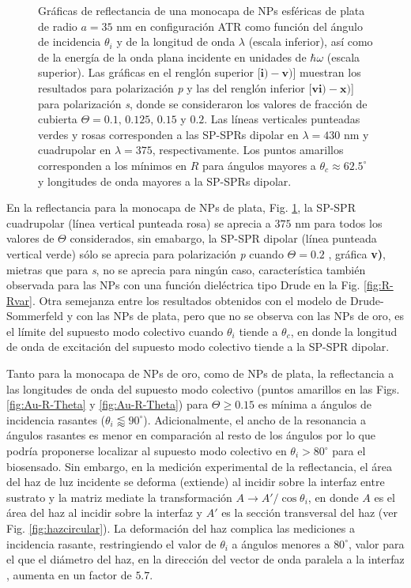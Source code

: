 \begin{figure}[h!]
\vspace*{-.5em}
	\caption{Gráficas de reflectancia de una monocapa de NPs esféricas de plata de radio $a=35$ nm en configuración ATR como función del ángulo de incidencia $\theta_i$ y de la longitud de onda $\lambda$ (escala inferior), así como de la energía de la onda plana incidente en unidades de $\hbar\omega$ (escala superior).  Las gráficas   en el renglón superior [$\mathbf{i)-v)}$] muestran los resultados para  polarización \emph{p} y las del renglón inferior  [$\mathbf{vi)-x)}$]  para polarización  \emph{s}, donde se consideraron los valores de fracción de cubierta $\Theta = 0.1,\,0.125,\,0.15$ y $0.2$.  Las líneas verticales punteadas verdes y rosas corresponden a las SP-SPRs dipolar en $\lambda=430$ nm y  cuadrupolar en $\lambda=375$, respectivamente.  Los puntos amarillos corresponden a los mínimos en $R$ para ángulos mayores a $\theta_c\approx 62.5^\circ$ y longitudes de onda mayores a la SP-SPRs dipolar.
}	\label{fig:Ag-R-Theta}	
	\end{figure}	

En la reflectancia para la monocapa de NPs de plata, Fig. \ref{fig:Ag-R-Theta}, la SP-SPR cuadrupolar (línea vertical punteada rosa) se aprecia a $375$ nm para todos los valores de $\Theta$ considerados, sin emabargo, la SP-SPR dipolar (línea punteada vertical verde) sólo se aprecia para polarización \emph{p} cuando $\Theta=0.2$ , gráfica \textbf{v)}, mietras que para \emph{s}, no se aprecia para ningún caso, característica también observada para las NPs con una función dieléctrica tipo Drude en la Fig. \ref{fig:R-Rvar}. Otra semejanza entre los resultados obtenidos con el modelo de Drude-Sommerfeld y con las NPs de plata, pero que no se observa con las NPs de oro, es el límite del supuesto modo colectivo cuando $\theta_i$ tiende a $\theta_c$, en donde la longitud de onda de excitación del supuesto modo colectivo tiende a la SP-SPR dipolar.

Tanto para la monocapa de NPs de oro, como de NPs de plata, la reflectancia a las longitudes de onda del supuesto modo colectivo (puntos amarillos en las Figs. \ref{fig:Au-R-Theta} y \ref{fig:Au-R-Theta}) para  $\Theta\geq 0.15$ es mínima a ángulos de incidencia rasantes ($\theta_i\lessapprox 90^\circ$).  Adicionalmente, el ancho de la resonancia a ángulos rasantes es menor en comparación al resto de los ángulos por lo que podría proponerse localizar al supuesto modo colectivo en $\theta_i>80^\circ$ para el biosensado. Sin embargo, en la medición experimental de la reflectancia, el área del haz de luz incidente se deforma (extiende) al incidir sobre la interfaz entre sustrato y la matriz mediate la transformación $A\to A'/\cos\theta_i$, en donde $A$ es el área del haz al incidir sobre la interfaz  y $A'$ es la sección transversal del haz (ver Fig. \ref{fig:hazcircular}). La deformación del haz complica las mediciones a incidencia rasante, restringiendo el valor de $\theta_i$ a ángulos menores a $80^\circ$, valor para el que el diámetro del haz, en la dirección del vector de onda  paralela a la interfaz , aumenta en un factor de $5.7$.

